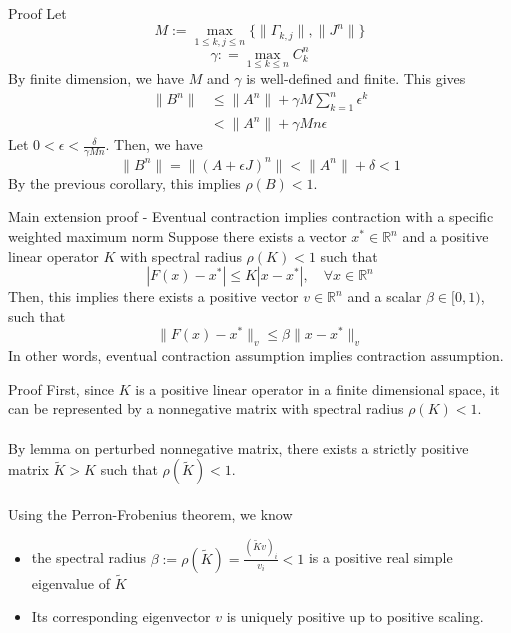 \documentclass[aspectratio=169]{beamer} %
\begin{document}
\begin{frame}{Proof}
Let 
    $$
    M:=\max_{1\le k,j\le n}\{\|\Gamma_{k,j}\|, \|J^n\|\}
    $$
    $$
    \gamma: =\max_{1\le k\le n} C^n_k
    $$
    By finite dimension, we have $M$ and $\gamma$ is well-defined and finite. This gives
   \begin{align*}
         \|B^n\| &\le \|A^n\| + \gamma M\sum_{k=1}^{n} \epsilon^k\\
         &<\|A^n\| + \gamma M n\epsilon \tag{$0<\epsilon<1$}
    \end{align*}
    Let $0<\epsilon <\frac{\delta}{\gamma Mn}$. Then, we have
    $$
    \|B^n\| = \|(A+\epsilon J)^n\|< \|A^n\| + \delta < 1
    $$
    By the previous corollary, this implies $\rho(B)<1$.
    
\end{frame}
\begin{frame}{Main extension proof - Eventual contraction implies contraction with a specific weighted maximum norm}
Suppose there exists a vector $x^*\in\mathbb{R}^n$ and a positive linear operator $K$ with spectral radius $\rho(K)<1$ such that 
$$
|F(x)-x^*|\le K|x-x^*|,\quad \forall x\in \mathbb{R}^n
$$
Then, this implies there exists a positive vector $v\in\mathbb{R}^n$ and a scalar $\beta\in [0,1)$, such that
$$
\|F(x)-x^*\|_v \le \beta\|x-x^*\|_v
$$
In other words, eventual contraction assumption implies contraction assumption.
    
\end{frame}
\begin{frame}{Proof}
First, since $K$ is a positive linear operator in a finite dimensional space, it can be represented by a nonnegative matrix with spectral radius $\rho(K)<1$.\\
    \\
    By lemma on perturbed nonnegative matrix, there exists a strictly positive matrix $\tilde K>K$ such that $\rho(\tilde K)<1$.\\
    \\
    Using the Perron-Frobenius theorem, we know
    \begin{itemize}
        \item the spectral radius $\beta:=\rho(\tilde K) =\frac{(\tilde Kv)_i}{v_i}<1 $ is a positive real simple eigenvalue of $\tilde K$
        \item Its corresponding eigenvector $v$ is uniquely positive up to positive scaling. 
    \end{itemize}
    
\end{frame}
\end{document}
